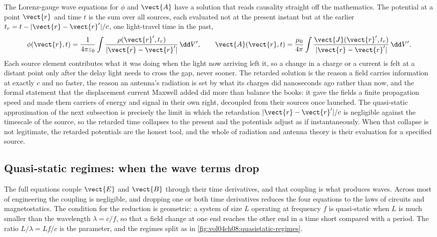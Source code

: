\begin{mastery}
The Lorenz-gauge wave equations for $\phi$ and $\vect{A}$ have a solution
that reads causality straight off the mathematics. The potential at a point
$\vect{r}$ and time $t$ is the sum over all sources, each evaluated not at
the present instant but at the earlier  $t_r = t -
|\vect{r} - \vect{r}'|/c$, one light-travel time in the past,
\[
\phi(\vect{r},t) = \frac{1}{4\pi\varepsilon_0}\int
\frac{\rho(\vect{r}', t_r)}{|\vect{r} - \vect{r}'|}\,\dd V', \qquad
\vect{A}(\vect{r},t) = \frac{\mu_0}{4\pi}\int
\frac{\vect{J}(\vect{r}', t_r)}{|\vect{r} - \vect{r}'|}\,\dd V'.
\]
Each source element contributes what it was doing when the light now
arriving left it, so a change in a charge or a current is felt at a distant
point only after the delay light needs to cross the gap, never sooner. The
retarded solution is the reason a field carries information at exactly $c$
and no faster, the reason an antenna's radiation is set by what its charges
did nanoseconds ago rather than now, and the formal statement that the
displacement current Maxwell added did more than balance the books: it gave
the fields a finite propagation speed and made them carriers of energy and
signal in their own right, decoupled from their sources once launched. The
quasi-static approximation of the next subsection is precisely the limit in
which the retardation $|\vect{r} - \vect{r}'|/c$ is negligible against the
timescale of the source, so the retarded time collapses to the present and
the potentials adjust as if instantaneously. When that collapse is not
legitimate, the retarded potentials are the honest tool, and the whole of
radiation and antenna theory is their evaluation for a specified source.
\end{mastery}

\subsection{Quasi-static regimes: when the wave terms drop}

The full equations couple $\vect{E}$ and $\vect{B}$ through their time
derivatives, and that coupling is what produces waves. Across most of
engineering the coupling is negligible, and dropping one or both time
derivatives reduces the four equations to the laws of circuits and
magnetostatics. The condition for the reduction is geometric: a system of
size $L$ operating at frequency $f$ is quasi-static when $L$ is much
smaller than the wavelength $\lambda = c/f$, so that a field change at one
end reaches the other end in a time short compared with a period. The
ratio $L/\lambda = Lf/c$ is the parameter, and the regimes split as in
\cref{fig:vol04ch08:quasistatic-regimes}.

